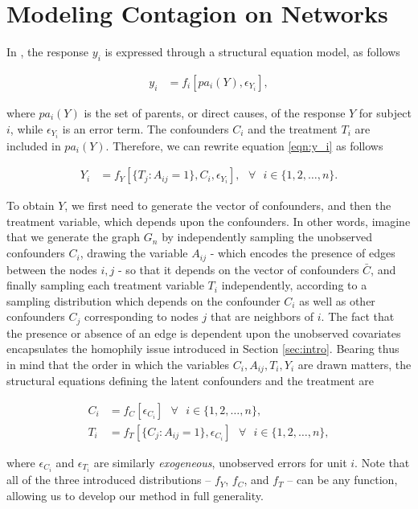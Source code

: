 \documentclass{article}
\begin{document}
\section{Modeling Contagion on Networks }
\label{sec:Ogburn}
In \cite{Ogburn2020}, the response $y_i$ is expressed through a structural equation model, as follows

\begin{align}
\label{eqn:y_i}
y_i &= f_i[pa_i(Y), \epsilon_{Y_i}],
\end{align}


\noindent where $pa_i(Y)$ is the set of parents, or direct causes, of the response $Y$ for subject $i$, while $\epsilon_{Y_i}$ is an error term. The confounders $C_i$ and the treatment $T_i$ are included in $pa_i(Y)$. Therefore, we can rewrite equation \ref{eqn:y_i} as follows


\begin{align*}
Y_i &= f_Y[\{ T_j: A_{ij} =1\}, C_i, \epsilon_{Y_i}], \mbox{ } \forall \mbox{ } i \in \{1, 2, \hdots, n\}.
\end{align*}


\noindent To obtain $Y$, we first need to generate the vector of confounders, and then the treatment variable, which depends upon the confounders. In other words, imagine that we generate the graph $G_n$ by independently sampling the unobserved confounders $C_i$, drawing the variable $A_{ij}$ - which encodes the presence of edges between the nodes $i, j$ - so that it depends on the vector of confounders $\bar{C}$, and finally sampling each treatment variable $T_i$ independently, according to a sampling distribution which depends on the confounder $C_i$ as well as other confounders $C_j$ corresponding to nodes $j$ that are neighbors of $i$. The fact that the presence or absence of an edge is dependent upon the unobserved covariates encapsulates the homophily issue introduced in Section \ref{sec:intro}. Bearing thus in mind that the order in which the variables $C_i, A_{ij}, T_i, Y_i$ are drawn matters, the structural equations defining the latent confounders and the treatment are 

\begin{align*}
C_i &= f_C[\epsilon_{C_i}] \mbox{ } \forall \mbox{ } i \in \{1, 2, \hdots, n\},\\
T_i &= f_{T}[\{C_j: A_{ij} =1 \}, \epsilon_{C_i}] \mbox{ } \forall \mbox{ } i \in \{1, 2, \hdots, n\},
\end{align*}

\noindent where $\epsilon_{C_i}$ and $\epsilon_{T_i}$ are similarly \textit{exogeneous}, unobserved errors for unit $i$. Note that all of the three introduced distributions -- $f_Y$, $f_C$, and $f_T$ -- can be any function, allowing us to develop our method in full generality. 
\end{document}
